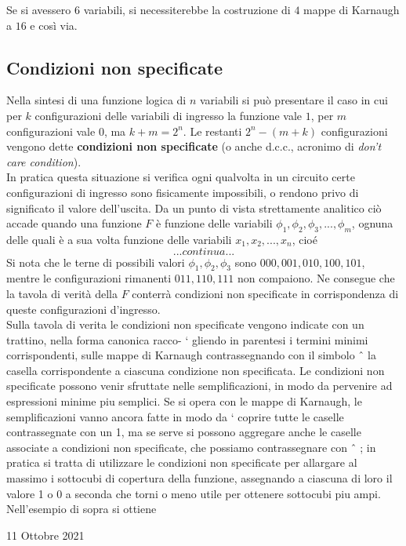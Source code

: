 \documentclass[a4paper]{extarticle}
\begin{document}
\noindent
Se si avessero \(6\) variabili, si necessiterebbe la costruzione di \(4\) mappe di Karnaugh a \(16\) e così via.

\subsection{Condizioni non specificate}
Nella sintesi di una funzione logica di \(n\) variabili si può presentare il caso in cui per \(k\) configurazioni delle variabili di ingresso la funzione vale \(1\), per \(m\) configurazioni vale \(0\), ma \(k + m = 2^n\). Le restanti \(2^n - (m + k)\) configurazioni vengono dette \textbf{condizioni non specificate} (o anche d.c.c., acronimo di \textit{don’t care condition}).\\
In pratica questa situazione si verifica ogni qualvolta in un circuito certe configurazioni di ingresso sono fisicamente impossibili, o rendono privo di significato il valore dell’uscita. Da un punto di vista strettamente analitico ciò accade quando una funzione \(F\) è funzione delle variabili \(\phi_1, \phi_2, \phi_3, ..., \phi_m\), ognuna delle quali è a sua volta funzione delle variabili \(x_1, x_2, ..., x_n\), cioé
\[... continua ...\]
Si nota che le terne di possibili valori \(\phi_1, \phi_2, \phi_3\) sono \(000, 001, 010, 100, 101\), mentre le configurazioni rimanenti \(011, 110, 111\) non compaiono. Ne consegue che la tavola di verità della \(F\) conterrà condizioni non specificate in corrispondenza di queste configurazioni d’ingresso.\\
Sulla tavola di verita le condizioni non specificate vengono indicate con un trattino, nella forma canonica racco- `
gliendo in parentesi i termini minimi corrispondenti, sulle mappe di Karnaugh contrassegnando con il simbolo ˆ
la casella corrispondente a ciascuna condizione non specificata.
Le condizioni non specificate possono venir sfruttate nelle semplificazioni, in modo da pervenire ad espressioni
minime piu semplici. Se si opera con le mappe di Karnaugh, le semplificazioni vanno ancora fatte in modo da `
coprire tutte le caselle contrassegnate con un 1, ma se serve si possono aggregare anche le caselle associate a
condizioni non specificate, che possiamo contrassegnare con ˆ ; in pratica si tratta di utilizzare le condizioni non
specificate per allargare al massimo i sottocubi di copertura della funzione, assegnando a ciascuna di loro il valore
1 o 0 a seconda che torni o meno utile per ottenere sottocubi piu ampi. Nell’esempio di sopra si ottiene

\newpage
\begin{center}
    11 Ottobre 2021
\end{center}
\end{document}
